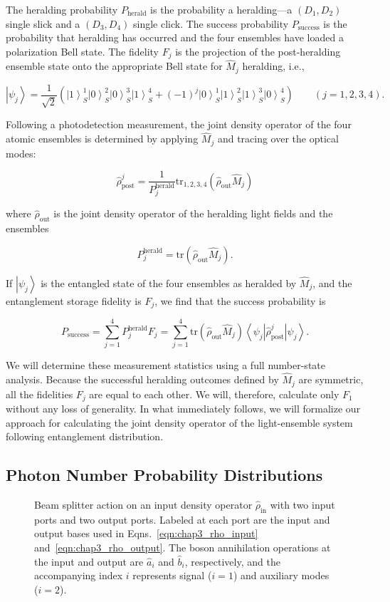 \documentclass[aps,twocolumn,secnumarabic,amsmath,amssymb,pra,groupedaddress,
showpacs, showkeys]{revtex4-1}
\newcommand{\bra}[1]{\left\langle #1 \right|}
\newcommand{\ket}[1]{\left|#1\right\rangle}
\newcommand{\pna}[1]{\left(#1\right)}
\newcommand{\eqn}[1]{
\begin{equation}
	#1
\end{equation}
}
\begin{document}
The heralding probability $P_{\textrm{herald}}$ is the probability a
heralding---a $\pna{D_1, D_2}$ single slick and a $\pna{D_3, D_4}$ single
click. The success probability $P_{\textrm{success}}$ is the probability that
heralding has occurred and the four ensembles have loaded a polarization Bell
state. The fidelity $F_j$ is the projection of the post-heralding ensemble
state onto the appropriate Bell state for $\hat{M}_j$ heralding, i.e.,
\eqn{
\ket{\psi_j} = \frac{1}{\sqrt{2}}\pna{\ket{1}_S^1\ket{0}_S^2\ket{0}_S^3\ket{1}_S^4+\pna{-1}^j \ket{0}_S^1\ket{1}_S^2\ket{1}_S^3\ket{0}_S^4} \qquad \pna{j=1,2,3,4}.\label{eqn:remaining_singlet}
}
Following a photodetection measurement, the joint density operator of the four
atomic ensembles is determined by applying $\hat{M}_j$ and tracing over the
optical modes:
	\eqn{
	\hat{\rho}_{\textrm{post}}^j=\frac{1}{P_j^{\textrm{herald}}}\textrm{tr}_{1,2,3,4}\pna{\hat{\rho}_{\textrm{out}}\hat{M}_j}
	}
	where $\hat{\rho}_{\textrm{out}}$ is the joint density operator of the heralding light fields and the ensembles 
	\eqn{
	P_j^{\textrm{herald}}=\textrm{tr}\pna{\hat{\rho}_{\textrm{out}}\hat{M}_j} \label{eqn:herald_prob}.
}
If $\ket{\psi_j}$ is the entangled state of the four ensembles as heralded by
$\hat{M}_j$, and the entanglement storage fidelity is $F_j$, we find that the
success probability is
\eqn{
P_{\textrm{success}} = \sum_{j=1}^4 P_j^{\textrm{herald}} F_j =\sum_{j=1}^{4} \textrm{tr}\pna{\hat{\rho}_{\textrm{out}}\hat{M}_j} \bra{\psi_j} \hat{\rho}_{\textrm{post}}^j \ket{\psi_j}.\label{eq:success_prob_def}  
}
We will determine these measurement statistics using a full number-state
analysis. Because the successful heralding outcomes defined by $\hat{M}_j$ are
symmetric, all the fidelities $F_j$ are equal to each other. We will,
therefore, calculate only $F_1$ without any loss of generality.  In what
immediately follows, we will formalize our approach for calculating the joint
density operator of the light-ensemble system following entanglement
distribution.

\subsection{Photon Number Probability Distributions}

\begin{figure}[tb]
	\centering
	\resizebox{3.00in}{!}{}
	\caption{Beam splitter action on an input density operator $\hat{\rho}_{\textrm{in}}$ with two input ports and two output ports. Labeled at each port are the input and output bases used in Eqns.~\ref{eqn:chap3_rho_input} and~\ref{eqn:chap3_rho_output}. The boson annihilation operations at the input and output are $\hat{a}_i$ and $\hat{b}_i$, respectively, and the accompanying index $i$ represents signal ($i=1$) and auxiliary modes ($i=2$).}
	\label{fig:beamsplitter_model}
\end{figure}
\end{document}
